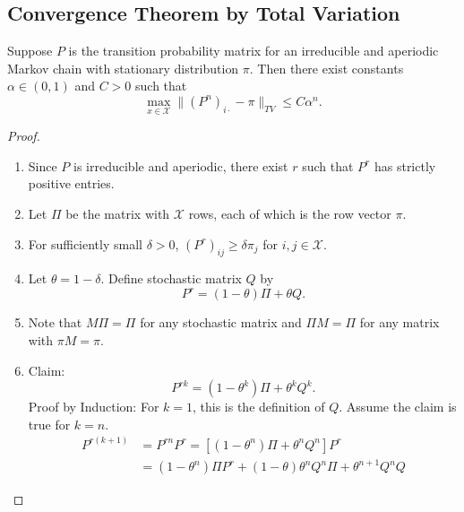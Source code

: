 \documentclass[12pt]{article}
\begin{document}
\subsection*{Convergence Theorem by Total Variation}

\begin{theorem}
    Suppose \( P \) is the transition probability matrix for an
    irreducible and aperiodic Markov chain with stationary distribution \(
    \pi \).  Then there exist constants \( \alpha \in (0,1) \) and \( C
    > 0 \) such that
    \[
        \max_{x \in \mathcal{X}} \| (P^n)_{i \cdot} - \pi \|_{TV} \le C
        \alpha^n.
    \]
\end{theorem}

\begin{proof}
    \begin{enumerate}
        \item
            Since \( P \) is irreducible and aperiodic, there exist \( r
            \) such that \( P^r \) has strictly positive entries.
        \item
            Let \( \Pi \) be the matrix with \( \mathcal{X} \) rows,
            each of which is the row vector \( \pi \).
        \item
            For sufficiently small \( \delta > 0 \), \( (P^r)_{ij} \ge
            \delta \pi_{j} \) for \( i,j \in \mathcal{X} \).
        \item
            Let \( \theta = 1-\delta \).  Define stochastic matrix \( Q \)
            by
            \[
                P^r = (1 - \theta)\Pi + \theta Q.
            \]
        \item
            Note that \( M \Pi = \Pi \) for any stochastic matrix and \(
            \Pi M =\Pi \) for any matrix with \( \pi M = \pi \).
        \item
            Claim:
            \[
                P^{rk} = (1- \theta^{k})\Pi + \theta^k Q^k.
            \] Proof by Induction:  For \( k=1 \), this is the
            definition of \( Q \).  Assume the claim is true for \( k=n \).
            \begin{align*}
                P^{r(k+1)} &= P^{rn} P^r = [(1-\theta^n)\Pi + \theta^n Q^n]P^r
                \\
                &= (1-\theta^n)\Pi P^r + (1-\theta) \theta^n Q^n \Pi +
                \theta^{n+1} Q^n Q
            \end{align*}

\end{enumerate}
\end{proof}
\end{document}
